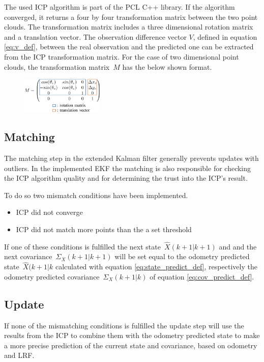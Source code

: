 The used ICP algorithm is part of the PCL C++ library. If the algorithm converged, it returns a four by four transformation matrix between the two point clouds. The transformation matrix includes a three dimensional rotation matrix and a translation vector. The observation difference vector $V$, defined in equation \eqref{eq:v_def}, between the real observation and the predicted one can be extracted from the ICP transformation matrix. For the case of two dimensional point clouds, the transformation \mbox{matrix $M$} has the below shown format.
\begin{figure}[h!]
\centering
\includegraphics[width=0.35\textwidth]{figures/M}
      \label{fig:transformation_matrix}
\end{figure}

\subsection{Matching}
\label{subsec:Matching}
The matching step in the extended Kalman filter generally prevents updates with outliers. In the implemented EKF the matching is also responsible for checking the ICP algorithm quality and for determining the trust into the ICP's result. 

To do so two mismatch conditions have been implemented.
\begin{itemize}
\item ICP did not converge
\item ICP did not match more points than the a set threshold
\end{itemize}
If one of these conditions is fulfilled the next \mbox{state $\hat{X}(k+1|k+1)$} and and the next \mbox{covariance $\Sigma_X (k+1|k+1)$} will be set equal to the odometry predicted \mbox{state $\hat{X}(k+1|k$} calculated with equation \eqref{eq:state_predict_def}, respectively the odometry predicted \mbox{covariance $\Sigma_{X}(k+1|k)$} of equation \eqref{eq:cov_predict_def}.

\subsection{Update}
\label{subsec:Update}
If none of the mismatching conditions is fulfilled the update step will use the results from the ICP to combine them with the odometry predicted state to make a more precise prediction of the current state and covariance, based on odometry and LRF. 

